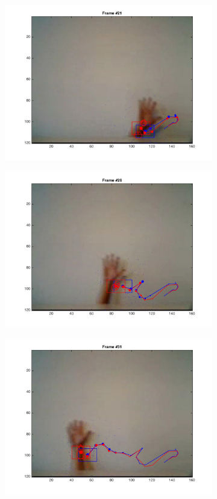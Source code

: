 \documentclass{ethz_report}
\begin{document}
\begin{figure}[h]
\begin{subfigure}[b]{.25\textwidth}
        \includegraphics[width=1\linewidth]{images/video1_11}
    \end{subfigure}%
    \begin{subfigure}[b]{.25\textwidth}
        \centering
        \includegraphics[width=1\linewidth]{images/video1_16}
    \end{subfigure}
    \begin{subfigure}[b]{.25\textwidth}
        \centering
        \includegraphics[width=1\linewidth]{images/video1_21}

\end{subfigure}
\end{figure}
\end{document}

